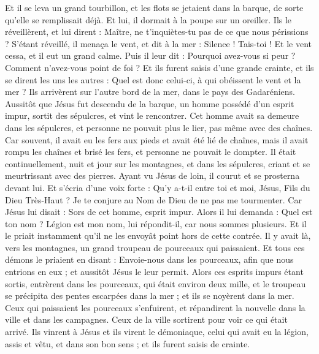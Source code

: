 \begin{multicols}{2}
Et il se leva un grand tourbillon, et les flots se jetaient dans la barque, de sorte qu'elle se remplissait déjà.
Et lui, il dormait à la poupe sur un oreiller. Ils le réveillèrent, et lui dirent : Maître, ne t’inquiètes-tu pas de ce que nous périssions ?
S’étant réveillé, il menaça le vent, et dit à la mer : Silence ! Tais-toi ! Et le vent cessa, et il eut un grand calme.
Puis il leur dit : Pourquoi avez-vous si peur ? Comment n'avez-vous point de foi ?
Et ils furent saisis d'une grande crainte, et ils se dirent les uns les autres : Quel est donc celui-ci, à qui obéissent le vent et la mer ?
\VerseOne{}Ils arrivèrent sur l’autre bord de la mer, dans le pays des Gadaréniens.
Aussitôt que Jésus fut descendu de la barque, un homme possédé d’un esprit impur, sortit des sépulcres, et vint le rencontrer.
Cet homme avait sa demeure dans les sépulcres, et personne ne pouvait plus le lier, pas même avec des chaînes.
Car souvent, il avait eu les fers aux pieds et avait été lié de chaînes, mais il avait rompu les chaînes et brisé les fers, et personne ne pouvait le dompter.
Il était continuellement, nuit et jour sur les montagnes, et dans les sépulcres, criant et se meurtrissant avec des pierres.
Ayant vu Jésus de loin, il courut et se prosterna devant lui.
Et s’écria d’une voix forte : Qu'y a-t-il entre toi et moi, Jésus, Fils du Dieu Très-Haut ? Je te conjure au Nom de Dieu de ne pas me tourmenter.
Car Jésus lui disait : Sors de cet homme, esprit impur.
Alors il lui demanda : Quel est ton nom ? Légion{} est mon nom, lui répondit-il, car nous sommes plusieurs.
Et il le priait instamment qu'il ne les envoyât point hors de cette contrée.
Il y avait là, vers les montagnes, un grand troupeau de pourceaux qui paissaient.
Et tous ces démons le priaient en disant : Envoie-nous dans les pourceaux, afin que nous entrions en eux ; et aussitôt Jésus le leur permit.
Alors ces esprits impurs étant sortis, entrèrent dans les pourceaux, qui était environ deux mille, et le troupeau se précipita des pentes escarpées dans la mer ; et ils se noyèrent dans la mer.
Ceux qui paissaient les pourceaux s'enfuirent, et répandirent la nouvelle dans la ville et dans les campagnes.
Ceux de la ville sortirent pour voir ce qui était arrivé. Ils vinrent à Jésus et ils virent le démoniaque, celui qui avait eu la légion, assis et vêtu, et dans son bon sens ; et ils furent saisis de crainte.

\end{multicols}
